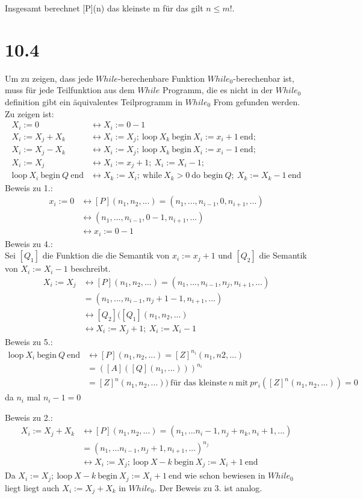 \documentclass[12pt, a4paper]{article}
\begin{document}
Insgesamt berechnet [P](n) das kleinste m für das gilt $n \le m!$.

\section*{10.4}
Um zu zeigen, dass jede $While$-berechenbare Funktion $While_0$-berechenbar ist, muss f\"ur jede Teilfunktion aus dem $While$ Programm, die es nicht in der $While_0$ definition gibt ein \"aquivalentes Teilprogramm in $While_0$ From gefunden werden. Zu zeigen ist:
\begin{align}
X_i := 0 &\leftrightarrow X_i := 0-1\\
X_i := X_j + X_k &\leftrightarrow X_i := X_j;\ \text{loop} \ X_k \ \text{begin} \ X_i := x_i+1 \ \text{end};\\
X_i := X_j - X_k &\leftrightarrow X_i := X_j;\ \text{loop}\ X_k\ \text{begin}\ X_i := x_i-1\ \text{end};\\
X_i := X_j &\leftrightarrow X_i := x_j+1;\ X_i := X_i-1;\\
\text{loop}\ X_i \ \text{begin}\ Q\ \text{end} &\leftrightarrow X_k := X_i;\ \text{while}\ X_k >  0\ \text{do begin}\ Q;\ X_k:=X_k-1\ \text{end}
\end{align}
Beweis zu 1.:\\
\begin{align*}
x_i:= 0 &\leftrightarrow [P](n_1, n_2, ...)=(n_1, ..., n_{i-1}, 0, n_{i+1}, ...)\\
&\leftrightarrow (n_1,...,n_{i-1}, 0-1,n_{i+1},...)\\
&\leftrightarrow x_i:=0-1
\end{align*}
Beweis zu 4.:\\
Sei $[Q_1]$ die Funktion die die Semantik von $x_i:=x_j +1$ und $[Q_2]$ die Semantik von $X_i:=X_i -1$ beschreibt.
\begin{align*}
X_i:= X_j &\leftrightarrow [P](n_1,n_2,...) = (n_1,...,n_{i-1},n_j,n_{i+1},...)\\
&= (n_1,...,n_{i-1}, n_j+1-1, n_{i+1},...)\\
&\leftrightarrow [Q_2]([Q_1](n_1,n_2,...)\\
&\leftrightarrow X_i:=X_j+1;\ X_i:=X_i-1
\end{align*}
Beweis zu 5.:
\begin{align*}
\text{loop}\ X_i \ \text{begin}\ Q\ \text{end} &\leftrightarrow [P](n_1,n_2,...)=[Z]^{n_i}(n_1,n2,...) \\
&=([A]([Q](n_1,...)))^{n_i}\\
&=[Z]^n(n_1,n_2,...)) \ \text{f\"ur das kleinste}\ n\ \text{mit}\ pr_i([Z]^n(n_1,n_2,...))=0
\end{align*}
da $n_i$ mal $n_i-1=0$

Beweis zu 2.:
\begin{align*}
X_i := X_j +X_k &\leftrightarrow [P](n_1,n_2,...)=(n_1,...n_i-1,n_j+n_k,n_i+1,...)\\
&=(n_1,...n_{i-1},n_j+1,n_{i+1},...)^{n_j}\\
&\leftrightarrow X_i:= X_j;\  \text{loop}\ X-k\ \text{begin}\ X_j := X_i +1\ \text{end}
\end{align*}
Da $X_i:= X_j;\  \text{loop}\ X-k\ \text{begin}\ X_j := X_i +1\ \text{end}$ wie schon bewiesen in $While_0$ liegt liegt auch $X_i:=X_j +X_k$ in $While_0$. Der Beweis zu 3. ist analog.
\end{document}

